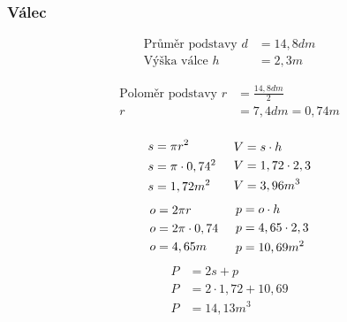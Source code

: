 \documentclass[12pt]{article}
\begin{document}
\pagebreak


\begin{multicols}{2}
\noindent
\subsubsection{Válec}
\begin{equation}
\begin{split}
\nonumber
\text{Průměr podstavy }d&=14,8dm\\
\text{Výška válce }h&=2,3m
\end{split}
\end{equation}

\begin{equation}
\begin{split}
\nonumber
\text{Poloměr podstavy }r&=\frac { 14,8dm }{ 2 }\\
r&=7,4dm=0,74m\\
\end{split}
\end{equation}

\begin{equation}
\begin{split}
\nonumber
s&=\pi { r }^{ 2 }\\
s&=\pi \cdot { 0,74 }^{ 2 }\\
s&={ 1,72m }^{ 2 }
\end{split}
\hspace{0,5cm}
\begin{split}
\nonumber
V&=s\cdot h\\
V&=1,72\cdot 2,3\\
V&={ 3,96m }^{ 3 }
\end{split}
\end{equation}
\begin{equation}
\begin{split}
\nonumber
o&=2\pi r\\
o&=2\pi \cdot 0,74\\
o&=4,65m
\end{split}
\hspace{0,5cm}
\begin{split}
\nonumber
p&=o \cdot h\\
p&=4,65 \cdot 2,3\\
p&={ 10,69m }^{ 2 }
\end{split}
\end{equation}
\begin{equation}
\begin{split}
\nonumber
P&=2s+p\\
P&=2 \cdot 1,72 + 10,69\\
P&={ 14,13m }^{ 3 }
\end{split}
\end{equation}

\end{multicols}
\end{document}
